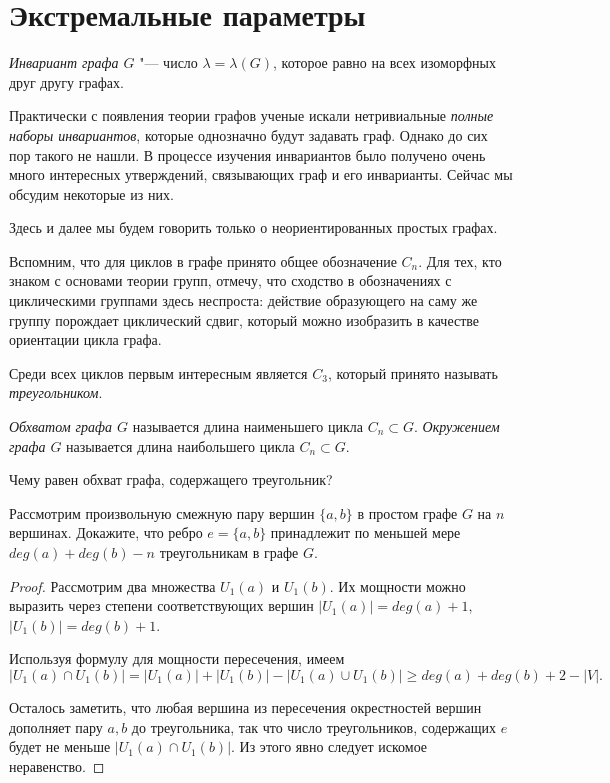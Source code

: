 \section{Экстремальные параметры}

\begin{definition}
	\emph{Инвариант графа $G$} "--- число $\lambda = \lambda (G)$, которое равно на всех изоморфных друг другу графах.
\end{definition}

	Практически с появления теории графов ученые искали нетривиальные \emph{полные наборы инвариантов}, которые однозначно будут задавать граф. Однако до сих пор такого не нашли. В процессе изучения инвариантов было получено очень много интересных утверждений, связывающих граф и его инварианты. Сейчас мы обсудим некоторые из них.


	Здесь и далее мы будем говорить только о неориентированных простых графах.

	Вспомним, что для циклов в графе принято общее обозначение $C_n$. Для тех, кто знаком с основами теории групп, отмечу, что сходство в обозначениях с циклическими группами здесь неспроста: действие образующего на саму же группу порождает циклический сдвиг, который можно изобразить в качестве ориентации цикла графа. 
	
	Среди всех циклов первым интересным является $C_3$, который принято называть \emph{треугольником}.
	
\begin{definition}
	\emph{Обхватом графа $G$} называется длина наименьшего цикла $C_n \subset G$. \emph{Окружением графа $G$} называется длина наибольшего цикла $C_n \subset G$. 
\end{definition}	

\begin{testquestion}
	Чему равен обхват графа, содержащего треугольник?
\end{testquestion}
	
\begin{example}
	Рассмотрим произвольную смежную пару вершин $\lbrace a, b\rbrace$ в простом графе $G$ на $n$ вершинах. Докажите, что ребро $e = \lbrace a, b\rbrace$ принадлежит по меньшей мере $deg(a) + deg(b) - n$ треугольникам в графе $G$.

\begin{proof}
	Рассмотрим два множества $U_1(a)$ и $U_1(b)$. Их мощности можно выразить через степени соответствующих вершин $|U_1(a)| = deg(a) + 1$, $|U_1(b)| = deg(b) + 1$.
	
	Используя формулу для мощности пересечения, имеем
	$$|U_1(a)\cap U_1(b)| = |U_1(a)| + |U_1(b)| - |U_1(a) \cup U_1(b)| \geqslant deg(a) + deg(b) + 2 - |V|.$$
	
	Осталось заметить, что любая вершина из пересечения окрестностей вершин дополняет пару $a, b$ до треугольника, так что число треугольников, содержащих $e$ будет не меньше $|U_1(a)\cap U_1(b)|$. Из этого явно следует искомое неравенство. 
\end{proof}
\end{example}

